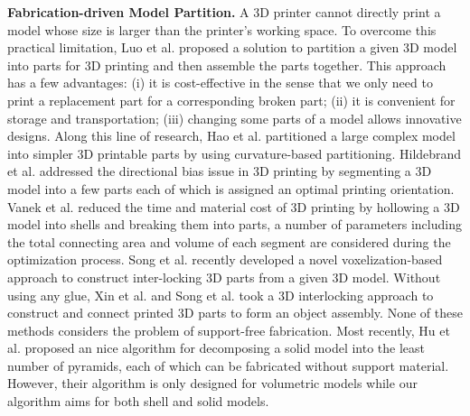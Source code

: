 \textbf{Fabrication-driven Model Partition.} A 3{D} printer cannot directly print a model whose size is larger than the printer's working space. To overcome this practical limitation, Luo et al. \cite{LuoBRM12} proposed a solution to partition a given 3D model into parts for 3D printing and then assemble the parts together. This approach has a few advantages: (i) it is cost-effective in the sense that we only need to print a replacement part for a corresponding broken part; (ii) it is convenient for storage and transportation; (iii) changing some parts of a model allows innovative designs. Along this line of research, Hao et al. \cite{hao2011efficient} partitioned a large complex model into simpler 3D printable parts by using curvature-based partitioning. Hildebrand et al. \cite{HildebrandBA13} addressed the directional bias issue in 3D printing by segmenting a 3D model into a few parts each of which is assigned an optimal printing orientation. Vanek et al. \cite{VanekGBMCSM14} reduced the time and material cost of 3D printing by hollowing a 3D model into shells and breaking them into parts, a number of parameters including the total connecting area and volume of each segment are considered during the optimization process.  Song et al. \cite{SongFLF15} recently developed a novel voxelization-based approach to construct inter-locking 3D parts from a given 3D model.  Without using any glue, Xin et al. \cite{XinLFWHC11} and Song et al. \cite{SongFC12} took a 3D interlocking approach to construct and connect printed 3D parts to form an object assembly. None of these methods considers the problem of support-free fabrication. Most recently, Hu et al. \cite{Hu_siga14} proposed an nice algorithm for decomposing a solid model into the least number of pyramids, each of which can be fabricated without support material. However, their algorithm is only designed for volumetric models while our algorithm aims for both shell and solid models.








